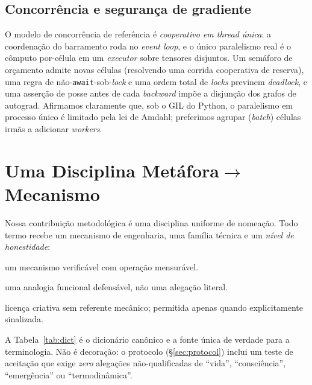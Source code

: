 \documentclass[11pt]{article}
\begin{document}
\subsection{Concorrência e segurança de gradiente}
O modelo de concorrência de referência é \emph{cooperativo em thread única}: a
coordenação do barramento roda no \emph{event loop}, e o único paralelismo real é
o cômputo por-célula em um \emph{executor} sobre tensores disjuntos. Um semáforo
de orçamento admite novas células (resolvendo uma corrida cooperativa de reserva),
uma regra de não-\texttt{await}-sob-\emph{lock} e uma ordem total de \emph{locks}
previnem \emph{deadlock}, e uma asserção de posse antes de cada \emph{backward}
impõe a disjunção dos grafos de autograd. Afirmamos claramente que, sob o GIL do
Python, o paralelismo em processo único é limitado pela lei de Amdahl; preferimos
agrupar (\emph{batch}) células irmãs a adicionar \emph{workers}.

\section{Uma Disciplina Metáfora$\rightarrow$Mecanismo}
\label{sec:honesty}
Nossa contribuição metodológica é uma disciplina uniforme de nomeação. Todo termo
recebe um mecanismo de engenharia, uma família técnica e um \emph{nível de
honestidade}:
\begin{honestidade}
\item[\textbf{N1 (concreto)}] um mecanismo verificável com operação mensurável.
\item[\textbf{N2 (analogia)}] uma analogia funcional defensável, não uma alegação
literal.
\item[\textbf{N3 (narrativa)}] licença criativa sem referente mecânico; permitida
apenas quando explicitamente sinalizada.
\end{honestidade}

A Tabela~\ref{tab:dict} é o dicionário canônico e a fonte única de verdade para a
terminologia. Não é decoração: o protocolo (\S\ref{sec:protocol}) inclui um teste
de aceitação que exige \emph{zero} alegações não-qualificadas de ``vida'',
``consciência'', ``emergência'' ou ``termodinâmica''.
\end{document}
